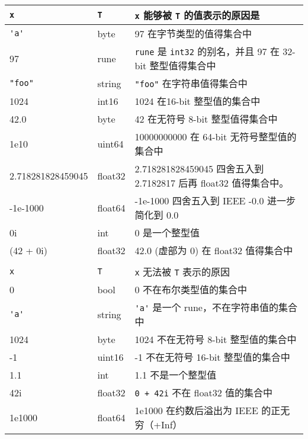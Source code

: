 \begin{table}
\begin{tabularx}{\textwidth}{llX}
\lstinline|x|		&\lstinline|T|&\lstinline|x| 能够被 \lstinline|T| 的值表示的原因是 \\
\hline
\lstinline|'a'|		&	byte	&	97 在字节类型的值得集合中 	\\
97          		&	rune	&	\lstinline|rune| 是 \lstinline|int32| 的别名，并且 97 在 32-bit 整型值得集合中 \\
\lstinline|"foo"|   &	string	&	\lstinline|"foo"| 在字符串值得集合中\\
1024            	&	int16	&	1024 在16-bit 整型值的集合中 \\
42.0            	&	byte	&	42 在无符号 8-bit 整型值得集合中 \\
1e10            	&	uint64 	&	10000000000 在 64-bit 无符号整型值的集合中 \\
2.718281828459045 	&	float32	&	2.718281828459045 四舍五入到 2.7182817 后再 float32 值得集合中。  \\
-1e-1000    		&	float64	&   -1e-1000 四舍五入到 IEEE -0.0 进一步简化到 0.0 \\
0i                 	&	int		&    0 是一个整型值	\\
(42 + 0i)          	&	float32	&   42.0 (虚部为 0) 在 float32 值得集合中 \\

\\

\lstinline|x|	&	\lstinline|T|	&	\lstinline|x| 无法被 \lstinline|T| 表示的原因 \\
\hline
0				&	bool			& 	0 不在布尔类型值的集合中	\\
\lstinline|'a'| &	string			&	\lstinline|'a'| 是一个 rune，不在字符串值的集合中	\\
1024			&	byte			& 	1024 不在无符号 8-bit 整型值的集合中	\\
-1				&	uint16			&	-1 不在无符号 16-bit 整型值的集合中	\\
1.1				&	int				&	1.1 不是一个整型值	\\
42i				&	float32			&	\lstinline|0 + 42i| 不在 float32 值的集合中	\\
1e1000			&	float64			&	1e1000	在约数后溢出为 IEEE 的正无穷（+Inf）\\

\end{tabularx}
\end{table}






